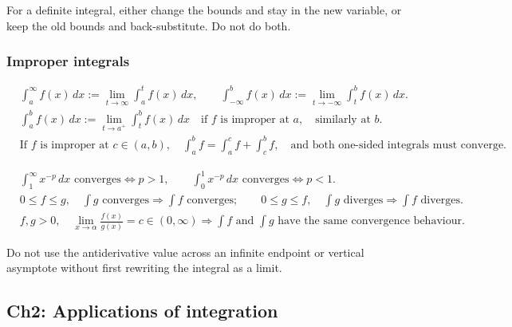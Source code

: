 \begin{commonmistake}
For a definite integral, either change the bounds and stay in the new variable,
or keep the old bounds and back-substitute.  Do not do both.
\end{commonmistake}

\subsubsection{Improper integrals}
\begin{keyformula}[title={Improper Integral Definitions}]
\begin{align*}
&\int_a^{\infty} f(x)\,dx:=\lim_{t\to\infty}\int_a^t f(x)\,dx,
\qquad
\int_{-\infty}^{b} f(x)\,dx:=\lim_{t\to-\infty}\int_t^b f(x)\,dx.\\
&\int_a^b f(x)\,dx:=\lim_{t\to a^+}\int_t^b f(x)\,dx
\quad\text{if }f\text{ is improper at }a,\quad
\text{similarly at }b.\\
&\text{If }f\text{ is improper at }c\in(a,b),\quad
\int_a^b f=\int_a^c f+\int_c^b f,
\quad\text{and both one-sided integrals must converge.}
\end{align*}
\end{keyformula}

\begin{keyformula}[title={Improper Integral Comparison and $p$-Tests}]
\begin{align*}
&\int_1^{\infty}x^{-p}\,dx\text{ converges}\Longleftrightarrow p>1,
\qquad
\int_0^1x^{-p}\,dx\text{ converges}\Longleftrightarrow p<1.\\
&0\le f\le g,
\quad \int g\text{ converges}\Rightarrow \int f\text{ converges};
\qquad
0\le g\le f,
\quad \int g\text{ diverges}\Rightarrow \int f\text{ diverges}.\\
&f,g>0,
\quad \lim_{x\to\alpha}\frac{f(x)}{g(x)}=c\in(0,\infty)
\Rightarrow \int f\text{ and }\int g\text{ have the same convergence behaviour.}
\end{align*}
\end{keyformula}

\begin{commonmistake}
Do not use the antiderivative value across an infinite endpoint or vertical
asymptote without first rewriting the integral as a limit.
\end{commonmistake}

\subsection{Ch2: Applications of integration}


